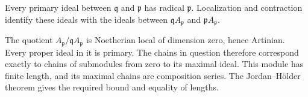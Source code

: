 Every primary ideal between $\mathfrak q$ and $\mathfrak p$ has radical $\mathfrak p$. Localization and contraction identify these ideals with the ideals between $\mathfrak qA_{\mathfrak p}$ and $\mathfrak pA_{\mathfrak p}$.

The quotient $A_{\mathfrak p}/\mathfrak qA_{\mathfrak p}$ is Noetherian local of dimension zero, hence Artinian. Every proper ideal in it is primary. The chains in question therefore correspond exactly to chains of submodules from zero to its maximal ideal. This module has finite length, and its maximal chains are composition series. The Jordan–Hölder theorem gives the required bound and equality of lengths.
